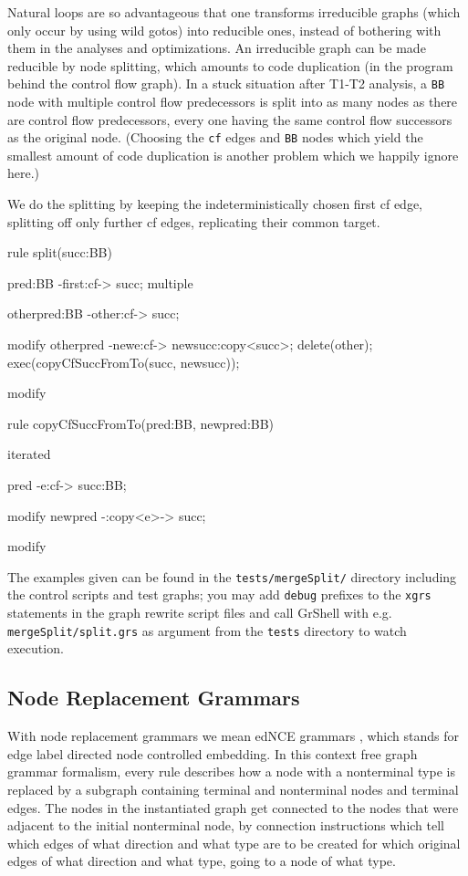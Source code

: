 Natural loops are so advantageous that one transforms irreducible graphs (which only occur by using wild gotos) into reducible ones, instead of bothering with them in the analyses and optimizations.
An irreducible graph can be made reducible by node splitting, which amounts to code duplication (in the program behind the control flow graph).
In a stuck situation after T1-T2 analysis, a \texttt{BB} node with multiple control flow predecessors is split into as many nodes as there are control flow predecessors, every one having the same control flow successors as the original node.
(Choosing the \texttt{cf} edges and \texttt{BB} nodes which yield the smallest amount of code duplication is another problem which we happily ignore here.)

  \begin{example}
We do the splitting by keeping the indeterministically chosen first cf edge, splitting off only further cf edges, replicating their common target.

    \begin{grgen}
rule split(succ:BB)
{
  pred:BB -first:cf-> succ;
  multiple {
    otherpred:BB -other:cf-> succ;

    modify {
      otherpred -newe:cf-> newsucc:copy<succ>;
      delete(other);
      exec(copyCfSuccFromTo(succ, newsucc));
    }
  }

  modify {
  }
}

rule copyCfSuccFromTo(pred:BB, newpred:BB)
{
  iterated {
    pred -e:cf-> succ:BB;

    modify {
      newpred -:copy<e>-> succ;
    }
  }

  modify {
  }
}
    \end{grgen}
  \end{example}

The examples given can be found in the \texttt{tests/mergeSplit/} directory including the control scripts and test graphs; you may add \texttt{debug} prefixes to the \texttt{xgrs} statements in the graph rewrite script files and call GrShell with e.g. \texttt{mergeSplit/split.grs} as argument from the \texttt{tests} directory to watch execution.


\subsection{Node Replacement Grammars}
With node replacement grammars we mean edNCE grammars \cite{NodeReplacement}, which stands for edge label directed node controlled embedding. In this context free graph grammar formalism, every rule describes how a node with a nonterminal type is replaced by a subgraph containing terminal and nonterminal nodes and terminal edges. The nodes in the instantiated graph get connected to the nodes that were adjacent to the initial nonterminal node, by connection instructions which tell which edges of what direction and what type are to be created for which original edges of what direction and what type, going to a node of what type.


